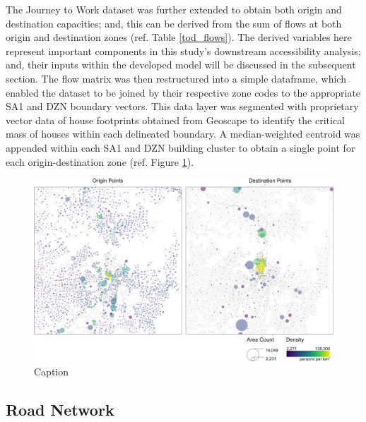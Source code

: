 The Journey to Work dataset was further extended to obtain both origin and destination capacities; and, this can be derived from the sum of flows at both origin and destination zones (ref. Table \ref{tod_flows}). The derived variables here represent important components in this study's downstream accessibility analysis; and, their inputs within the developed model will be discussed in the subsequent section. The flow matrix was then restructured into a simple dataframe, which enabled the dataset to be joined by their respective zone codes to the appropriate SA1 and DZN boundary vectors. This data layer was segmented with proprietary vector data of house footprints obtained from Geoscape to identify the critical mass of houses within each delineated boundary. A median-weighted centroid was appended within each SA1 and DZN building cluster to obtain a single point for each origin-destination zone (ref. Figure \ref{fig:odpoints}).\\

\begin{figure}[!ht]
    \centering
    \includegraphics[width=1\textwidth]{body/figures/od_points.png}
    \caption{Caption}
    \label{fig:odpoints}
\end{figure}

\subsection{Road Network}

